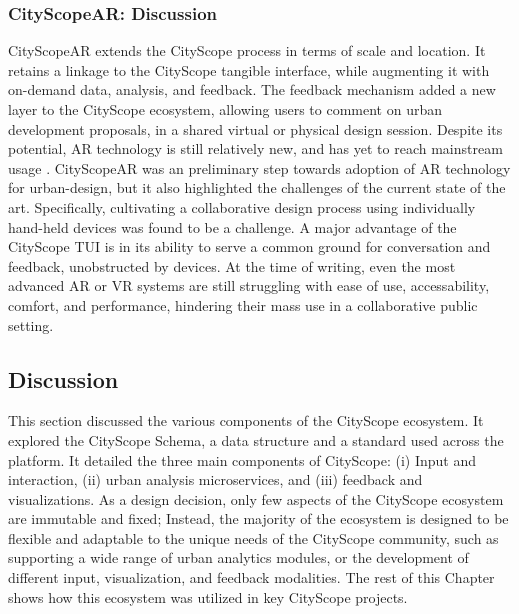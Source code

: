 {{      \subsubsection{CityScopeAR: Discussion}
      {
          CityScopeAR extends the CityScope process in terms of scale and location. It retains a linkage to the CityScope tangible interface, while augmenting it with on-demand data, analysis, and feedback. The feedback mechanism added a new layer to the CityScope ecosystem, allowing users to comment on urban development proposals, in a shared virtual or physical design session.
          \newline
          Despite its potential, AR technology is still relatively new, and has yet to reach mainstream usage \cite{mekni2014augmented}. CityScopeAR was an preliminary step towards adoption of AR technology for urban-design, but it also highlighted the challenges of the current state of the art. Specifically, cultivating a collaborative design process using individually hand-held devices was found to be a challenge. A major advantage of the CityScope TUI is in its ability to serve a common ground for conversation and feedback, unobstructed by devices. At the time of writing, even the most advanced AR or VR systems are still struggling with ease of use, accessability, comfort, and performance, hindering their mass use in a collaborative public setting.
      }
  }

  \subsection{Discussion}
  {

      This section discussed the various components of the CityScope ecosystem. It explored the CityScope Schema, a data structure and a standard used across the platform. It detailed the three main components of CityScope: (i) Input and interaction, (ii) urban analysis microservices, and (iii) feedback and visualizations. As a design decision, only few aspects of the CityScope ecosystem are immutable and fixed; Instead, the majority of the ecosystem is designed to be flexible and adaptable to the unique needs of the CityScope community, such as supporting a wide range of urban analytics modules, or the development of different input, visualization, and feedback modalities. The rest of this Chapter shows how this ecosystem was utilized in key CityScope projects.
  }
 }
